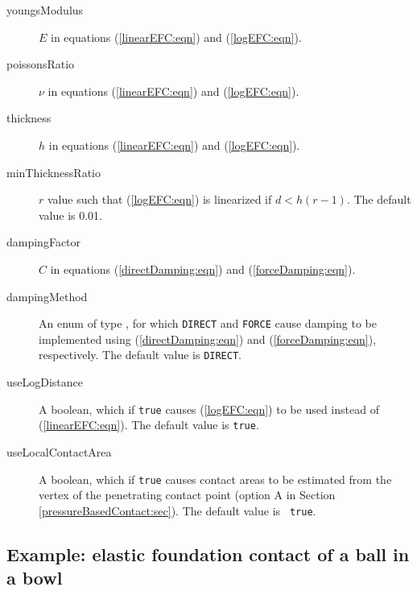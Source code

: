 \begin{description}

\item[youngsModulus]\mbox{}

$E$ in equations (\ref{linearEFC:eqn}) and (\ref{logEFC:eqn}).

\item[poissonsRatio]\mbox{}

$\nu$ in equations (\ref{linearEFC:eqn}) and (\ref{logEFC:eqn}).

\item[thickness]\mbox{}

$h$ in equations (\ref{linearEFC:eqn}) and (\ref{logEFC:eqn}).

\item[minThicknessRatio]\mbox{}

$r$ value such that (\ref{logEFC:eqn}) is linearized if $d < h (r-1)$.
The default value is 0.01.

\item[dampingFactor]\mbox{}

$C$ in equations (\ref{directDamping:eqn}) and (\ref{forceDamping:eqn}).

\item[dampingMethod]\mbox{}

An enum of type
,
for which {\tt DIRECT} and {\tt FORCE} cause damping to be implemented
using (\ref{directDamping:eqn}) and (\ref{forceDamping:eqn}),
respectively. The default value is {\tt DIRECT}.

\item[useLogDistance]\mbox{}

A boolean, which if {\tt true} causes (\ref{logEFC:eqn})
to be used instead of (\ref{linearEFC:eqn}). The default
value is {\tt true}.

\item[useLocalContactArea]\mbox{}

A boolean, which if {\tt true} causes contact areas to be estimated
from the vertex of the penetrating contact point (option A in
Section \ref{pressureBasedContact:sec}). The default value is {\tt
true}.

\end{description}

\subsection{Example: elastic foundation contact of a ball in a bowl}
\label{ElasticFoundationContactDemo:sec}

